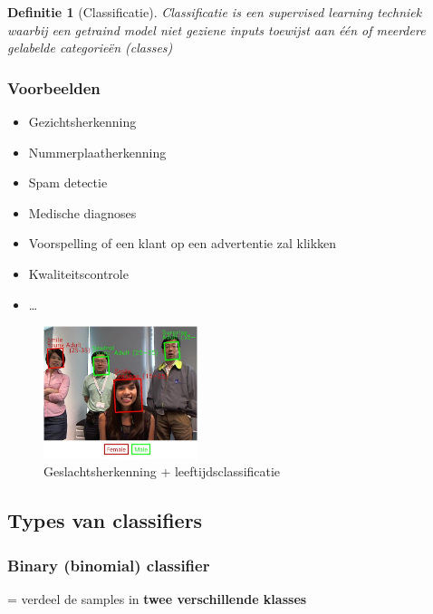 \documentclass{article}
\newtheorem{theorem}{Definitie}[section]
\begin{document}
\begin{theorem}[Classificatie]
Classificatie is een supervised learning techniek waarbij een getraind model
niet geziene inputs toewijst aan één of meerdere gelabelde categorieën (classes)
\end{theorem}

\subsubsection{Voorbeelden}

\begin{itemize}
    \item Gezichtsherkenning
    \item Nummerplaatherkenning
    \item Spam detectie
    \item Medische diagnoses
    \item Voorspelling of een klant op een advertentie zal klikken
    \item Kwaliteitscontrole
    \item \dots
\end{itemize}

\begin{figure}[H]
    \centering
    \includegraphics[width=0.4\textwidth]{classificatie-gezichtsherkenning.png}
    \caption{Geslachtsherkenning + leeftijdsclassificatie}
\end{figure}


\subsection{Types van classifiers}

\subsubsection{Binary (binomial) classifier}

= verdeel de samples in \textbf{twee verschillende klasses}
\end{document}
